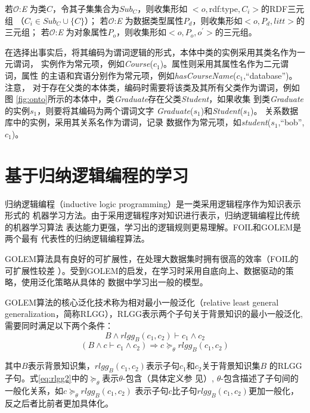 若$\mathcal{O}$:\emph{E} 为类$C$，令其子集集合为$Sub_C$，则收集形如
$<o,$rdf:type$,C_i>$的RDF三元组 （$C_i \in Sub_C \cup \{C\}$）；
若$\mathcal{O}$:\emph{E} 为数据类型属性$P_d$，则收集形如$<o,P_d,litt>$的三元组；
若$\mathcal{O}$:\emph{E} 为对象属性$P_o$，则收集形如$<o,P_o,o^\prime>$的三元组。


在选择出事实后，将其编码为谓词逻辑的形式，本体中类的实例采用其类名作为一元谓词，
实例作为常元项，例如\emph{Course}($c_1$)。属性则采用其属性名作为二元谓词，属性
的主语和宾语分别作为常元项，例如\emph{hasCourseName}($c_1$,``database'')。注意，
对于存在父类的本体类，编码时需要将该类及其所有父类作为谓词，例如图
\ref{fig:onto}所示的本体中，类\emph{Graduate}存在父类\emph{Student}，如果收集
到类\emph{Graduate}的实例$s_1$，则要将其编码为两个谓词文字
\emph{Graduate}($s_1$)和\emph{Student}($s_1$)。
关系数据库中的实例，采用其关系名作为谓词，记录
数据作为常元项，如\emph{student}($s_1$,``bob'',$c_1$)。

\section{基于归纳逻辑编程的学习}

归纳逻辑编程（inductive logic programming）是一类采用逻辑程序作为知识表示形式的
机器学习方法。由于采用逻辑程序对知识进行表示，归纳逻辑编程比传统的机器学习算法
表达能力更强，学习出的逻辑规则更易理解。FOIL\cite{18}和GOLEM\cite{8}是两个最有
代表性的归纳逻辑编程算法。

GOLEM算法具有良好的可扩展性，在处理大数据集时拥有很高的效率（FOIL的可扩展性较差
）。受到GOLEM的启发，在学习时采用自底向上、数据驱动的策略，使用泛化策略从具体的
数据中学习出一般的模型。

GOLEM算法的核心泛化技术称为相对最小一般泛化（relative least general
 generalization，简称RLGG）\cite{8}，RLGG表示两个子句关于背景知识的最小一般泛化,
需要同时满足以下两个条件：
\begin{equation}
B \land rlgg_B(c_1,c_2) \vdash c_1 \land c_2
\label{eq:rlgg1}
\end{equation}
\begin{equation}
(B \land c \vdash c_1 \land c_2) \Rightarrow c \succeq _\theta rlgg_B(c_1,c_2)
\label{eq:rlgg2}
\end{equation}

其中$B$表示背景知识集，$rlgg_B(c_1,c_2)$表示子句$c_1$和$c_2$关于背景知识集$B$
的RLGG子句。式\ref{eq:rlgg2}中的$\succeq _\theta$表示$\theta$-包含（具体定义参
见\cite{8}）,
$\theta$-包含描述了子句间的一般化关系，如$c \succeq _\theta rlgg_B(c_1,c_2)$
表示子句$c$比子句$rlgg_B(c_1,c_2)$更加一般化，反之后者比前者更加具体化。

